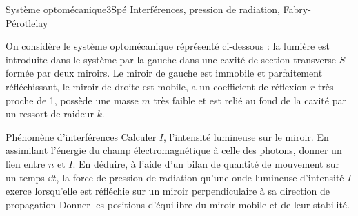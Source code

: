 \begin{exercise}{Système optomécanique}{3}{Spé}
{Interférences, pression de radiation, Fabry-Pérot}{lelay}

On considère le système optomécanique réprésenté ci-dessous : la lumière est introduite dans le système par la gauche dans une cavité de section transverse $S$ formée par deux miroirs. Le miroir de gauche est immobile et parfaitement réfléchissant, le miroir de droite est mobile, a un coefficient de réflexion $r$ très proche de 1, possède une masse $m$ très faible et est relié au fond de la cavité par un ressort de raideur $k$.

\begin{center}
\end{center}

\begin{questions}
    \questioncours Phénomène d'interférences
    \question Calculer $I$, l'intensité lumineuse sur le miroir.
    \question En assimilant l'énergie du champ électromagnétique à celle des photons, donner un lien entre $n$ et $I$.
    \question En déduire, à l'aide d'un bilan de quantité de mouvement sur un temps $\dd{t}$, la force de pression de radiation qu'une onde lumineuse d'intensité $I$ exerce lorsqu'elle est réfléchie sur un miroir perpendiculaire à sa direction de propagation
    \question Donner les positions d'équilibre du miroir mobile et de leur stabilité.
\end{questions}
\end{exercise}

